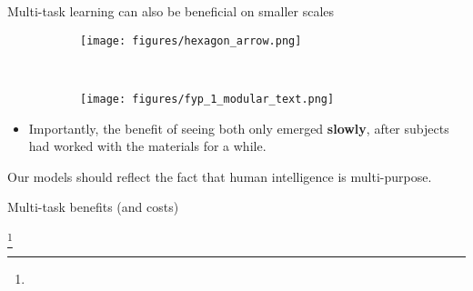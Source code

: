 \documentclass{beamer}
\newcommand\blfootnote[1]{%
  \begingroup
  \renewcommand\thefootnote{}\footnote{#1}%
  \addtocounter{footnote}{-1}%
  \endgroup
}
\begin{document}
\begin{frame}{Multi-task learning can also be beneficial on smaller scales}
\begin{figure}
\centering
\begin{subfigure}{0.3\textwidth}
\texttt{[image: figures/hexagon\_arrow.png]}
\end{subfigure}~
\begin{subfigure}{0.65\textwidth}
\texttt{[image: figures/fyp\_1\_modular\_text.png]}
\end{subfigure}
\end{figure}
\vspace{2em}
\begin{itemize}
\item<2-> Importantly, the benefit of seeing both only emerged \textbf{slowly}, after subjects had worked with the materials for a while.
\end{itemize}
\vspace{2em}
{
\scriptsize
\citep{Lampinen2017b}
}
\end{frame}

\begin{frame}[standout]
Our models should reflect the fact that human intelligence is multi-purpose.\par
\end{frame}

\begin{frame}{Multi-task benefits (and costs)}
\begin{figure}
\centering
{}
\end{figure}
\vspace{1em}
\blfootnote{}
\end{frame}
\end{document}

